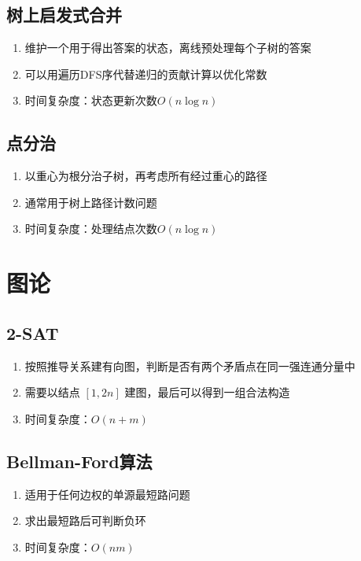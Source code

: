 \documentclass[twocolumn,a4,8pt]{article}  %
\begin{document}
		\subsection{树上启发式合并}
			\noindent\begin{enumerate}
				\item 维护一个用于得出答案的状态，离线预处理每个子树的答案
				\item 可以用遍历DFS序代替递归的贡献计算以优化常数
				\item 时间复杂度：状态更新次数$O(n\log n)$
			\end{enumerate}
	 	 	
	 	 	
		\subsection{点分治}
			\noindent\begin{enumerate}
				\item 以重心为根分治子树，再考虑所有经过重心的路径
				\item 通常用于树上路径计数问题
				\item 时间复杂度：处理结点次数$O(n\log n)$
			\end{enumerate}
			
	 	 	
	\section{图论}
		\subsection{2-SAT}
			\noindent\begin{enumerate}
				\item 按照推导关系建有向图，判断是否有两个矛盾点在同一强连通分量中
				\item 需要以结点 $[1,2n]$ 建图，最后可以得到一组合法构造
				\item 时间复杂度：$O(n+m)$
			\end{enumerate}
	 	 	

		\subsection{Bellman-Ford算法}
			\noindent\begin{enumerate}
				\item 适用于任何边权的单源最短路问题
				\item 求出最短路后可判断负环
				\item 时间复杂度：$O(nm)$
			\end{enumerate}
	 	 	
	 	 	
\end{document}
